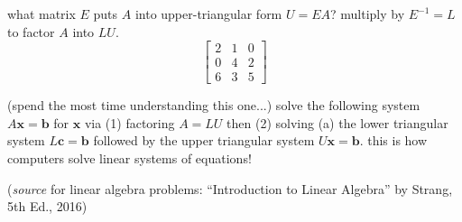 \documentclass[addpoints]{exam}
\begin{document}
\begin{questions}
\question what matrix $E$ puts $A$ into upper-triangular form $U=EA$? multiply by $E^{-1}=L$ to factor $A$ into $LU$.
\begin{equation*}
	\begin{bmatrix}
	2 & 1 & 0  \\
	0 & 4 & 2 \\
	6 & 3 & 5
	\end{bmatrix}
\end{equation*}

\question (spend the most time understanding this one...) solve the following system $A\mathbf{x}=\mathbf{b}$ for $\mathbf{x}$ via (1) factoring $A=LU$ then (2) solving (a) the lower triangular system $L\mathbf{c}=\mathbf{b}$ followed by the upper triangular system $U\mathbf{x}=\mathbf{b}$. this is how computers solve linear systems of equations!

\end{questions}

 (\emph{source} for linear algebra problems: ``Introduction to Linear Algebra'' by Strang, 5th Ed., 2016)
\end{document}
